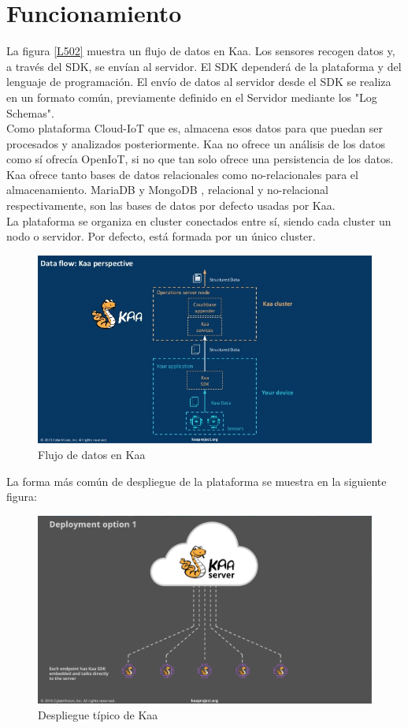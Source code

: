 \documentclass[12pt, twoside]{book}
\begin{document}
\section{Funcionamiento}
La figura \ref{L502} muestra un flujo de datos en Kaa. Los sensores recogen datos y, a través del SDK, se envían al servidor. El SDK dependerá de la plataforma y del lenguaje de programación. El envío de datos al servidor desde el SDK se realiza en un formato común, previamente definido en el Servidor mediante los "Log Schemas". \\
Como plataforma Cloud-IoT que es, almacena esos datos para que puedan ser procesados y analizados posteriormente. Kaa no ofrece un análisis de los datos como sí ofrecía OpenIoT, si no que tan solo ofrece una persistencia de los datos. Kaa ofrece tanto bases de datos relacionales como no-relacionales para el almacenamiento. MariaDB y MongoDB , relacional y no-relacional respectivamente, son las bases de datos por defecto usadas por Kaa.\\
La plataforma se organiza en cluster conectados entre sí, siendo cada cluster un nodo o servidor. Por defecto, está formada por un único cluster. 
\begin{figure}[H]
\centering
\includegraphics[scale=0.4]{images/kaa_platform1}
\caption{Flujo de datos en Kaa}\label{deployment1}
\end{figure} 
La forma más común de despliegue de la plataforma se muestra en la siguiente figura:
\begin{figure}[H]
\centering
\includegraphics[scale=0.4]{images/deployment1_kaa}
\caption{Despliegue típico de Kaa}\label{deployment2}
\end{figure} 
\end{document}
